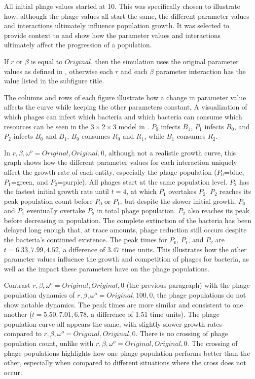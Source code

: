 All initial phage values started at 10. 
This was specifically chosen to illustrate how, although the phage values all start the same, the different parameter values and interactions ultimately influence population growth. 
It was selected to provide context to and show how the parameter values and interactions ultimately affect the progression of a population. 

If $r$ or $\beta$ is equal to $Original$, then the simulation uses the original parameter values as defined in , otherwise each $r$ and each $\beta$ parameter interaction has the value listed in the subfigure title. 

The columns and rows of each figure illustrate how a change in parameter value affects the curve while keeping the other parameters constant. 
A visualization of which phages can infect which bacteria and which bacteria can consume which resources can be seen in the $3 \times 2\times 3$ model in . $P_0$ infects $B_1$, $P_1$ infects $B_0$, and $P_2$ infects $B_0$ and $B_1$. 
$B_0$ consumes $R_0$ and $R_1$, while $B_1$ consumes $R_2$. 

In $r, \beta, \omega^o=Original, Original, 0$, although not a realistic growth curve, this graph shows how the different parameter values for each interaction uniquely affect the growth rate of each entity, especially the phage population ($P_0$=blue, $P_1$=green, and $P_2$=purple). 
All phages start at the same population level. 
$P_2$ has the fastest initial growth rate until $t=4$, at which $P_1$ overtakes $P_2$. 
$P_2$ reaches its peak population count before $P_0$ or $P_1$, but despite the slower initial growth, $P_0$ and $P_1$ eventually overtake $P_2$ in total phage population. 
$P_2$ also reaches its peak before decreasing in population. 
The complete extinction of the bacteria has been delayed long enough that, at trace amounts, phage reduction still occurs despite the bacteria's continued existence. 
The peak times for $P_0$, $P_1$, and $P_2$ are $t=6.33, 7.99, 4.52$, a difference of $3.47$ time units. 
This illustrates how the other parameter values influence the growth and competition of phages for bacteria, as well as the impact these parameters have on the phage populations. 

Contrast $r, \beta, \omega^o=Original, Original, 0$ (the previous paragraph) with the phage population dynamics of $r, \beta, \omega^o = Original, 100, 0$, the phage populations do not show notable dynamics. 
The peak times are more similar and consistent to one another ($t=5.50, 7.01, 6.78$, a difference of $1.51$ time units). 
The phage population curve all appears the same, with slightly slower growth rates compared to $r, \beta, \omega^o=Original, Original, 0$. 
There is no crossing of phage population count, unlike with $r, \beta, \omega^o=Original, Original, 0$. 
The crossing of phage populations highlights how one phage population performs better than the other, especially when compared to different situations where the cross does not occur. 

